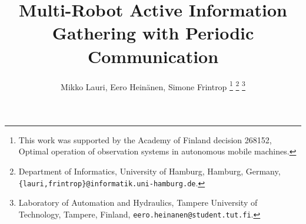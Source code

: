 \documentclass[letterpaper, 10 pt, conference]{IEEEtran}
\theoremstyle{plain}
\begin{document}
\title{\LARGE \bf Multi-Robot Active Information Gathering with Periodic Communication}

\author{Mikko Lauri, Eero Hein\"{a}nen, Simone Frintrop%
\thanks{This work was supported by the Academy of Finland decision 268152, Optimal operation of observation systems in autonomous mobile machines.}
\thanks{ Department of Informatics, University of Hamburg, Hamburg, Germany, {\tt\small \{lauri,frintrop\}@informatik.uni-hamburg.de}.}%
\thanks{ Laboratory of Automation and Hydraulics, Tampere University of Technology, Tampere, Finland, {\tt\small eero.heinanen@student.tut.fi}.}%
}
\maketitle
















\end{document}
